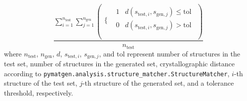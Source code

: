 \begin{equation} \label{eq:coverage}
	\frac{\sum _{i=1}^{n_{\text{test}}} \sum _{j=1}^{n_{\text{gen}}} \left(
\begin{array}{cc}
 \{ &
\begin{array}{cc}
 1 & d\left(s_{\text{test},i},s_{\text{gen},j}\right)\leq \text{tol} \\
 0 & d\left(s_{\text{test},i},s_{\text{gen},j}\right)>\text{tol} \\
\end{array}
 \\
\end{array}
\right)}{n_{\text{test}}}
\end{equation}
where $n_{\text{test}}$, $n_{\text{gen}}$, $d$, $s_{\text{test},i}$, $s_{\text{gen},j}$, and $\text{tol}$ represent number of structures in the test set, number of structures in the generated set, crystallographic distance according to \texttt{pymatgen.analysis.structure\_matcher.StructureMatcher}, $i$-th structure of the test set, $j$-th structure of the generated set, and a tolerance threshold, respectively.
